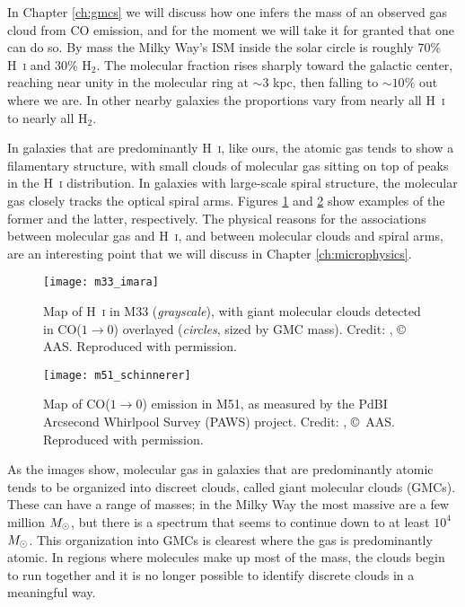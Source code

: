 In Chapter \ref{ch:gmcs} we will discuss how one infers the mass of an observed gas cloud from CO emission, and for the moment we will take it for granted that one can do so. By mass the Milky Way's ISM inside the solar circle is roughly 70\% H~\textsc{i} and 30\% H$_2$. The molecular fraction rises sharply toward the galactic center, reaching near unity in the molecular ring at $\sim 3$ kpc, then falling to $\sim 10\%$ out where we are. In other nearby galaxies the proportions vary from nearly all H~\textsc{i} to nearly all H$_2$.

In galaxies that are predominantly H~\textsc{i}, like ours, the atomic gas tends to show a filamentary structure, with small clouds of molecular gas sitting on top of peaks in the H~\textsc{i} distribution. In galaxies with large-scale spiral structure, the molecular gas closely tracks the optical spiral arms. Figures \ref{fig:m33_imara} and \ref{fig:m51_schinnerer} show examples of the former and the latter, respectively. The physical reasons for the associations between molecular gas and H~\textsc{i}, and between molecular clouds and spiral arms, are an interesting point that we will discuss in Chapter \ref{ch:microphysics}. 

\begin{figure}
\texttt{[image: m33\_imara]}
\caption[Distribution of H~\textsc{i} and GMCs in M33]{
\label{fig:m33_imara}
Map of H~\textsc{i} in M33 (\textit{grayscale}), with giant molecular clouds detected in CO($1\rightarrow 0$) overlayed (\textit{circles}, sized by GMC mass). Credit: \citet{imara11b}, \copyright\, AAS. Reproduced with permission.
}
\end{figure}

\begin{figure}
\texttt{[image: m51\_schinnerer]}
\caption[Distribution of CO($1\rightarrow 0$) emission in M51]{
\label{fig:m51_schinnerer}
Map of CO($1\rightarrow 0$) emission in M51, as measured by the PdBI Arcsecond Whirlpool Survey (PAWS) project. Credit: \citet{schinnerer13a}, \copyright\, AAS. Reproduced with permission.
}
\end{figure}

As the images show, molecular gas in galaxies that are predominantly atomic tends to be organized into discreet clouds, called giant molecular clouds (GMCs). These can have a range of masses; in the Milky Way the most massive are a few million $M_{\odot}$, but there is a spectrum that seems to continue down to at least $10^4$ $M_{\odot}$. This organization into GMCs is clearest where the gas is predominantly atomic. In regions where molecules make up most of the mass, the clouds begin to run together and it is no longer possible to identify discrete clouds in a meaningful way.


